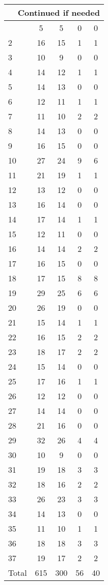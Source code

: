 \begin{center}
\begin{longtable}{l|c|c|c|c}
\hline \multicolumn{5}{|r|}{{Continued if needed}} \\ \hline
\endfoot 
1 & 5 & 5 & 0 & 0\\ \hline
2 & 16 & 15 & 1 & 1\\ \hline
3 & 10 & 9 & 0 & 0\\ \hline
4 & 14 & 12 & 1 & 1\\ \hline
5 & 14 & 13 & 0 & 0\\ \hline
6 & 12 & 11 & 1 & 1\\ \hline
7 & 11 & 10 & 2 & 2\\ \hline
8 & 14 & 13 & 0 & 0\\ \hline
9 & 16 & 15 & 0 & 0\\ \hline
10 & 27 & 24 & 9 & 6\\ \hline
11 & 21 & 19 & 1 & 1\\ \hline
12 & 13 & 12 & 0 & 0\\ \hline
13 & 16 & 14 & 0 & 0\\ \hline
14 & 17 & 14 & 1 & 1\\ \hline
15 & 12 & 11 & 0 & 0\\ \hline
16 & 14 & 14 & 2 & 2\\ \hline
17 & 16 & 15 & 0 & 0\\ \hline
18 & 17 & 15 & 8 & 8\\ \hline
19 & 29 & 25 & 6 & 6\\ \hline
20 & 26 & 19 & 0 & 0\\ \hline
21 & 15 & 14 & 1 & 1\\ \hline
22 & 16 & 15 & 2 & 2\\ \hline
23 & 18 & 17 & 2 & 2\\ \hline
24 & 15 & 14 & 0 & 0\\ \hline
25 & 17 & 16 & 1 & 1\\ \hline
26 & 12 & 12 & 0 & 0\\ \hline
27 & 14 & 14 & 0 & 0\\ \hline
28 & 21 & 16 & 0 & 0\\ \hline
29 & 32 & 26 & 4 & 4\\ \hline
30 & 10 & 9 & 0 & 0\\ \hline
31 & 19 & 18 & 3 & 3\\ \hline
32 & 18 & 16 & 2 & 2\\ \hline
33 & 26 & 23 & 3 & 3\\ \hline
34 & 14 & 13 & 0 & 0\\ \hline
35 & 11 & 10 & 1 & 1\\ \hline
36 & 18 & 18 & 3 & 3\\ \hline
37 & 19 & 17 & 2 & 2\\ \hline
\hline \hline
Total & 615 & 300 & 56 & 40



\end{longtable}
\end{center}

